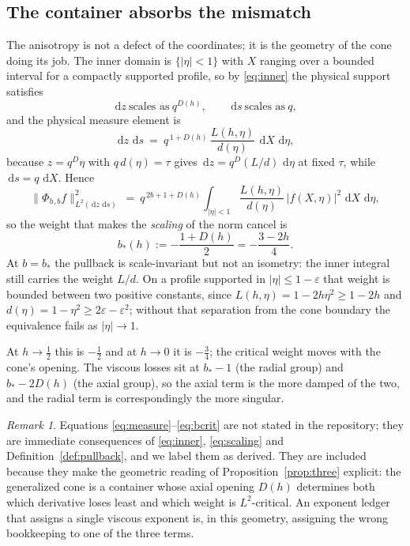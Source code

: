 \documentclass[11pt]{article}
\newcommand{\dd}{\,\mathrm{d}}
\newcommand{\abs}[1]{\left\lvert #1\right\rvert}
\newcommand{\Ph}{\Phi}
\theoremstyle{plain}
\theoremstyle{definition}
\theoremstyle{remark}
\newtheorem{remark}[theorem]{Remark}
\begin{document}
\subsection{The container absorbs the mismatch}
\label{sec:container}

The anisotropy is not a defect of the coordinates; it is the geometry of the
cone doing its job. The inner domain is $\{\abs{\eta}<1\}$ with $X$ ranging over
a bounded interval for a compactly supported profile, so by \eqref{eq:inner} the
physical support satisfies
\[
  \dd z\ \text{scales as}\ q^{D(h)},\qquad \dd s\ \text{scales as}\ q ,
\]
and the physical measure element is
\begin{equation}
  \dd z\,\dd s\ =\ q^{\,1+D(h)}\,\frac{L(h,\eta)}{d(\eta)}\ \dd X\,\dd\eta ,
  \label{eq:measure}
\end{equation}
because $z=q^{D}\eta$ with $q\,d(\eta)=\tau$ gives
$\dd z=q^{D}(L/d)\,\dd\eta$ at fixed $\tau$, while $\dd s=q\,\dd X$. Hence
\begin{equation}
  \bigl\lVert \Ph_{h,b}f\bigr\rVert_{L^{2}(\dd z\,\dd s)}^{2}
  \ =\ q^{\,2b+1+D(h)}\int_{\abs{\eta}<1}\frac{L(h,\eta)}{d(\eta)}\,
  \abs{f(X,\eta)}^{2}\,\dd X\,\dd\eta ,
  \label{eq:l2}
\end{equation}
so the weight that makes the \emph{scaling} of the norm cancel is
\begin{equation}
  b_{*}(h):=-\frac{1+D(h)}{2}=-\frac{3-2h}{4}.
  \label{eq:bcrit}
\end{equation}
At $b=b_{*}$ the pullback is scale-invariant but not an isometry: the inner
integral still carries the weight $L/d$. On a profile supported in
$\abs{\eta}\le1-\varepsilon$ that weight is bounded between two positive
constants, since $L(h,\eta)=1-2h\eta^{2}\ge1-2h$ and
$d(\eta)=1-\eta^{2}\ge2\varepsilon-\varepsilon^{2}$; without that separation
from the cone boundary the equivalence fails as $\abs{\eta}\to1$.

At $h\to\tfrac12$ this is $-\tfrac12$ and at $h\to0$ it is $-\tfrac34$; the
critical weight moves with the cone's opening. The viscous losses sit at
$b_{*}-1$ (the radial group) and $b_{*}-2D(h)$ (the axial group), so the axial
term is the more damped of the two, and the radial term is correspondingly the
more singular.

\begin{remark}
Equations \eqref{eq:measure}--\eqref{eq:bcrit} are not stated in the repository;
they are immediate consequences of \eqref{eq:inner}, \eqref{eq:scaling} and
Definition~\ref{def:pullback}, and we label them as derived. They are included
because they make the geometric reading of Proposition~\ref{prop:three}
explicit: the generalized cone is a container whose axial opening $D(h)$
determines both which derivative loses least and which weight is $L^2$-critical.
An exponent ledger that assigns a single viscous exponent is, in this geometry,
assigning the wrong bookkeeping to one of the three terms.
\end{remark}
\end{document}
